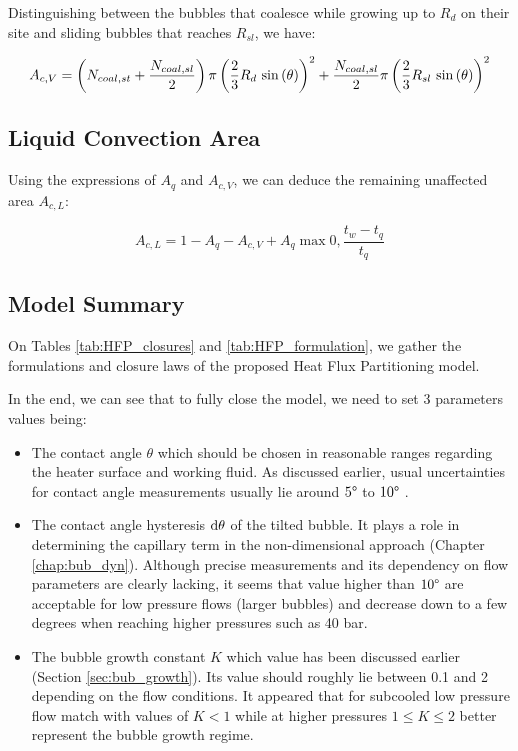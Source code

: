 Distinguishing between the bubbles that coalesce while growing up to $R_{d}$ on their site and sliding bubbles that reaches $R_{sl}$, we have:

\begin{equation}
A_{c,V} = \parth{N_{coal,st} + \dfrac{N_{coal,sl}}{2}}\pi \parth{\dfrac{2}{3}R_{d}\ \sin{\theta}}^{2} + \dfrac{N_{coal,sl}}{2}\pi \parth{\dfrac{2}{3}R_{sl}\ \sin{\theta}}^{2}
\end{equation}


\subsection{Liquid Convection Area}

Using the expressions of $A_{q}$ and $A_{c,V}$, we can deduce the remaining unaffected area $A_{c,L}$:

\begin{equation}
A_{c,L} = 1 - A_{q} - A_{c,V} + A_{q}\max{0, \frac{t_{w}-t_{q}}{t_{q}}}
\end{equation}

\subsection{Model Summary}

On Tables \ref{tab:HFP_closures} and \ref{tab:HFP_formulation}, we gather the formulations and closure laws of the proposed Heat Flux Partitioning model.

\npar


In the end, we can see that to fully close the model, we need to set 3 parameters values being:

\begin{itemize}
\item The contact angle $\theta$ which should be chosen in reasonable ranges regarding the heater surface and working fluid. As discussed earlier, usual uncertainties for contact angle measurements usually lie around $5\degree$ to $10\degree$ \cite{guan_bubble_2015}.

\item The contact angle hysteresis $\mathrm{d}\theta$ of the tilted bubble. It plays a role in determining the capillary term in the non-dimensional approach (Chapter \ref{chap:bub_dyn}). Although precise measurements and its dependency on flow parameters are clearly lacking, it seems that value higher than $10 \degree$ are acceptable for low pressure flows (larger bubbles) and decrease down to a few degrees when reaching higher pressures such as 40 bar.

\item The bubble growth constant $K$ which value has been discussed earlier (Section \ref{sec:bub_growth}). Its value should roughly lie between 0.1 and 2 depending on the flow conditions. It appeared that for subcooled low pressure flow match with values of $K < 1$ while at higher pressures $1 \leq K \leq 2$ better represent the bubble growth regime.
\end{itemize}




